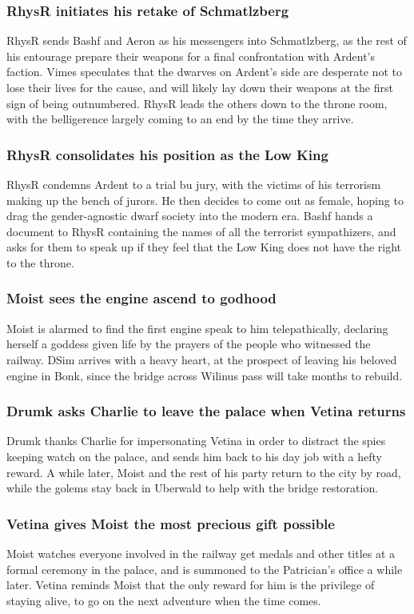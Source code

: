 \subsubsection{\Gls{RhysR} initiates his retake of Schmatlzberg}
\Gls{RhysR} sends \Gls{Bashf} and \Gls{Aeron} as his messengers into Schmatlzberg, as the rest of
his entourage prepare their weapons for a final confrontation with \Gls{Ardent}'s faction.
\Gls{Vimes} speculates that the dwarves on \Gls{Ardent}'s side are desperate not to lose their lives
for the cause, and will likely lay down their weapons at the first sign of being outnumbered.
\Gls{RhysR} leads the others down to the throne room, with the belligerence largely coming to an
end by the time they arrive.

\subsubsection{\Gls{RhysR} consolidates his position as the Low King}
\Gls{RhysR} condemns \Gls{Ardent} to a trial bu jury, with the victims of his terrorism making up
the bench of jurors. He then decides to come out as female, hoping to drag the gender-agnostic
dwarf society into the modern era. \Gls{Bashf} hands a document to \Gls{RhysR} containing the names
of all the terrorist sympathizers, and asks for them to speak up if they feel that the Low King
does not have the right to the throne.

\subsubsection{\Gls{Moist} sees the engine ascend to godhood}
\Gls{Moist} is alarmed to find the first engine speak to him telepathically, declaring herself a
goddess given life by the prayers of the people who witnessed the railway. \Gls{DSim} arrives with
a heavy heart, at the prospect of leaving his beloved engine in Bonk, since the bridge across
Wilinus pass will take months to rebuild.

\subsubsection{\Gls{Drumk} asks \Gls{Charlie} to leave the palace when \Gls{Vetina} returns}
\Gls{Drumk} thanks \Gls{Charlie} for impersonating \Gls{Vetina} in order to distract the spies
keeping watch on the palace, and sends him back to his day job with a hefty reward. A while later,
\Gls{Moist} and the rest of his party return to the city by road, while the golems stay back in
Uberwald to help with the bridge restoration.

\subsubsection{\Gls{Vetina} gives \Gls{Moist} the most precious gift possible}
\Gls{Moist} watches everyone involved in the railway get medals and other titles at a formal
ceremony in the palace, and is summoned to the Patrician's office a while later. \Gls{Vetina}
reminds \Gls{Moist} that the only reward for him is the privilege of staying alive, to go on the
next adventure when the time comes.